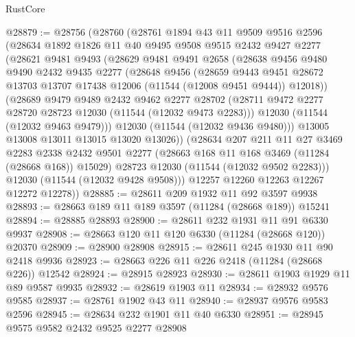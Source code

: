 \begin{lexlean}{RustCore}
\begin{coremodule}
@28879 := @28756
    (@28760
      (@28761
        @1894
        @43
        @11
        @9509
        @9516
        @2596
        (@28634
          @1892
          @1826
          @11
          @40
          @9495
          @9508
          @9515
          @2432
          @9427
          @2277
          (@28621
            @9481
            @9493
            (@28629
              @9481
              @9491
              @2658
              (@28638
                @9456
                @9480
                @9490
                @2432
                @9435
                @2277
                (@28648
                  @9456
                  (@28659
                    @9443
                    @9451
                    @28672
                    @13703
                    @13707
                    @17438
                    @12006
                    (@11544 (@12008 @9451 @9444))
                    @12018))
                (@28689
                  @9479
                  @9489
                  @2432
                  @9462
                  @2277
                  @28702
                  (@28711 @9472 @2277 @28720 @28723 @12030 (@11544 (@12032 @9473 @2283)))
                  @12030
                  (@11544 (@12032 @9463 @9479)))
                @12030
                (@11544 (@12032 @9436 @9480)))
              @13005
              @13008
              @13011
              @13015
              @13020
              @13026))
          (@28634
            @207
            @211
            @11
            @27
            @3469
            @2283
            @2338
            @2432
            @9501
            @2277
            (@28663 @168 @11 @168 @3469 (@11284 (@28668 @168)) @15029)
            @28723
            @12030
            (@11544 (@12032 @9502 @2283)))
          @12030
          (@11544 (@12032 @9428 @9508)))
        @12257
        @12260
        @12263
        @12267
        @12272
        @12278))
@28885 := @28611 @209 @1932 @11 @92 @3597 @9938
@28893 := @28663 @189 @11 @189 @3597 (@11284 (@28668 @189)) @15241
@28894 := @28885 @28893
@28900 := @28611 @232 @1931 @11 @91 @6330 @9937
@28908 := @28663 @120 @11 @120 @6330 (@11284 (@28668 @120)) @20370
@28909 := @28900 @28908
@28915 := @28611 @245 @1930 @11 @90 @2418 @9936
@28923 := @28663 @226 @11 @226 @2418 (@11284 (@28668 @226)) @12542
@28924 := @28915 @28923
@28930 := @28611 @1903 @1929 @11 @89 @9587 @9935
@28932 := @28619 @1903 @11
@28934 := @28932 @9576 @9585
@28937 := @28761 @1902 @43 @11
@28940 := @28937 @9576 @9583 @2596
@28945 := @28634 @232 @1901 @11 @40 @6330
@28951 := @28945 @9575 @9582 @2432 @9525 @2277 @28908

\end{coremodule}
\end{lexlean}
